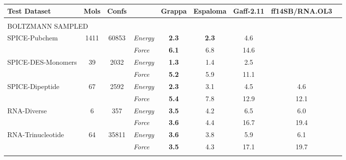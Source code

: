 \documentclass[varwidth]{standalone}
\newcommand{\widthbetweentype}{7pt}
\begin{document}
\begin{adjustbox}{width=\textwidth,center}
\centering

\renewcommand{\arraystretch}{1.0} %

\begin{tabular}{l c c l c c c c c}

\hline
\hline
Test Dataset & Mols & Confs & & Grappa & Espaloma & Gaff-2.11 & ff14SB/RNA.OL3 \\
\hline
\multicolumn{8}{l}{\vspace{\widthbetweentype}} \\[-1em]
\multicolumn{8}{l}{\small{BOLTZMANN SAMPLED}} \\\hline
\multirow{2}{*}{SPICE-Pubchem} & \multirow{2}{*}{1411} & \multirow{2}{*}{60853} & \textit{Energy} & \textbf{2.3} & \textbf{2.3} & 4.6 & \\
                                   &                       &                         & \textit{Force}  & \textbf{6.1} & 6.8 & 14.6 & \\
\hline
\multirow{2}{*}{SPICE-DES-Monomers} & \multirow{2}{*}{39} & \multirow{2}{*}{2032} & \textit{Energy} & \textbf{1.3} & 1.4 & 2.5 & \\
                                   &                       &                         & \textit{Force}  & \textbf{5.2} & 5.9 & 11.1 & \\
\hline
\multirow{2}{*}{SPICE-Dipeptide} & \multirow{2}{*}{67} & \multirow{2}{*}{2592} & \textit{Energy} & \textbf{2.3} & 3.1 & 4.5 & 4.6\\
                                   &                       &                         & \textit{Force}  & \textbf{5.4} & 7.8 & 12.9 & 12.1\\
\hline
\multirow{2}{*}{RNA-Diverse} & \multirow{2}{*}{6} & \multirow{2}{*}{357} & \textit{Energy} & \textbf{3.5} & 4.2 & 6.5 & 6.0\\
                                   &                       &                         & \textit{Force}  & \textbf{3.6} & 4.4 & 16.7 & 19.4\\
\hline
\multirow{2}{*}{RNA-Trinucleotide} & \multirow{2}{*}{64} & \multirow{2}{*}{35811} & \textit{Energy} & \textbf{3.6} & 3.8 & 5.9 & 6.1\\
                                   &                       &                         & \textit{Force}  & \textbf{3.5} & 4.3 & 17.1 & 19.7\\
\hline
\multicolumn{8}{l}{\vspace{\widthbetweentype}} \\[-1em]

\end{tabular}
\end{adjustbox}
\end{document}
